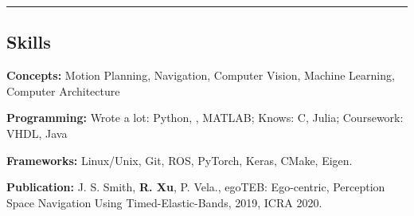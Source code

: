 \cvcond{\vspace{-0.5em}}
\hrule
\vspace{-1em}
\subsection*{Skills}
\cvcond{\vspace{-0.5em}}

\begin{indentsection}{\parindent}
    \setlength\itemsep{2em}
    \begin{description*}
        \item \textbf{Concepts:} Motion Planning, Navigation, Computer Vision, Machine Learning, Computer Architecture
        \item \textbf{Programming:} {Wrote a lot}: Python, \CPP, MATLAB; {Knows}: C, Julia; {Coursework}: VHDL, Java
        \item \textbf{Frameworks:} Linux/Unix, Git, ROS, PyTorch, Keras, CMake, Eigen.
        \item \textbf{Publication:} J. S. Smith, \textbf{R. Xu}, P. Vela., egoTEB: Ego-centric, Perception Space Navigation Using Timed-Elastic-Bands, 2019, ICRA 2020.
        
    \end{description*}
\end{indentsection}